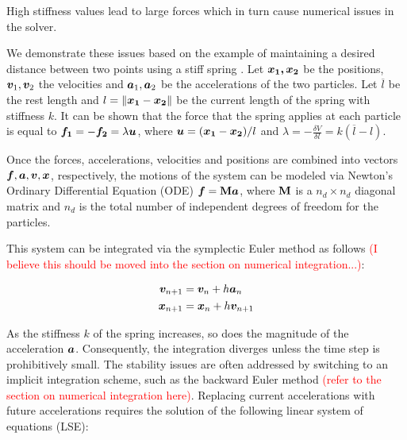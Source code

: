 
High stiffness values lead to large forces which in turn cause numerical issues in the solver. 

We demonstrate these issues based on the example of maintaining a desired distance between two points using a stiff 
spring \cite{tournier2015}. Let $\bm{x_1, x_2}$ be the positions, $\bm{v}_1, \bm{v}_2$ the velocities and $\bm{a}_1, \bm{a}_2$
be the accelerations of the two particles. Let $\overline{l}$ be the rest length and $l = \lVert \bm{x_1} - \bm{x_2} \rVert$ 
be the current length of the spring with stiffness $k$. It can be shown that the force that the spring applies at each particle
is equal to $\bm{f_1} = -\bm{f_2} = \lambda\bm{u}$, where $\bm{u} = (\bm{x_1} - \bm{x_2}) / l$
and $\lambda = -\frac{\delta V}{\delta l} = k(\overline{l} - l)$. 

Once the forces, accelerations, velocities and positions are combined into vectors $\bm{f}, \bm{a}, \bm{v}, \bm{x}$, 
respectively, the motions of the system can be modeled via Newton's Ordinary Differential Equation (ODE) $\bm{f} = \mathbf{M}\bm{a}$,
where $\mathbf{M}$ is a $n_d \times n_d$ diagonal matrix and $n_d$ is the total number of independent degrees of freedom for the 
particles.

This system can be integrated via the symplectic Euler method as follows \textcolor{red}{(I believe this should be moved into
the section on numerical integration...)}:

\begin{align*}
    \bm{v}_{n+1} &= \bm{v}_n + h\bm{a}_n \\
    \bm{x}_{n+1} &= \bm{x}_n + h\bm{v}_{n+1}
\end{align*}

As the stiffness $k$ of the spring increases, so does the magnitude of the acceleration $\bm{a}$. Consequently, the integration
diverges unless the time step is prohibitively small. The stability issues are often addressed by switching to an implicit 
integration scheme, such as the backward Euler method \cite{baraff1998} \textcolor{red}{(refer to the section on numerical 
integration here)}. Replacing current accelerations with future accelerations requires the solution of the following linear 
system of equations (LSE):

